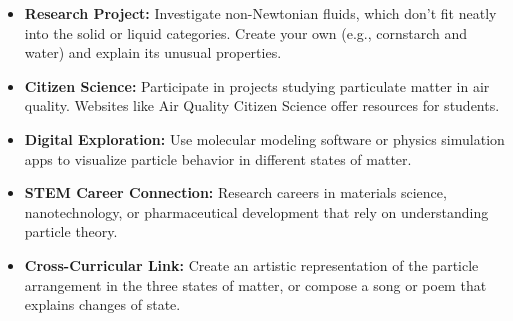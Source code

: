 \documentclass[justified,notoc]{tufte-book}
\begin{document}
\begin{itemize}
    \item \textbf{Research Project:} Investigate non-Newtonian fluids, which don't fit neatly into the solid or liquid categories. Create your own (e.g., cornstarch and water) and explain its unusual properties.
    
    \item \textbf{Citizen Science:} Participate in projects studying particulate matter in air quality. Websites like Air Quality Citizen Science offer resources for students.
    
    \item \textbf{Digital Exploration:} Use molecular modeling software or physics simulation apps to visualize particle behavior in different states of matter.
    
    \item \textbf{STEM Career Connection:} Research careers in materials science, nanotechnology, or pharmaceutical development that rely on understanding particle theory.
    
    \item \textbf{Cross-Curricular Link:} Create an artistic representation of the particle arrangement in the three states of matter, or compose a song or poem that explains changes of state.
\end{itemize}

\end{document}
